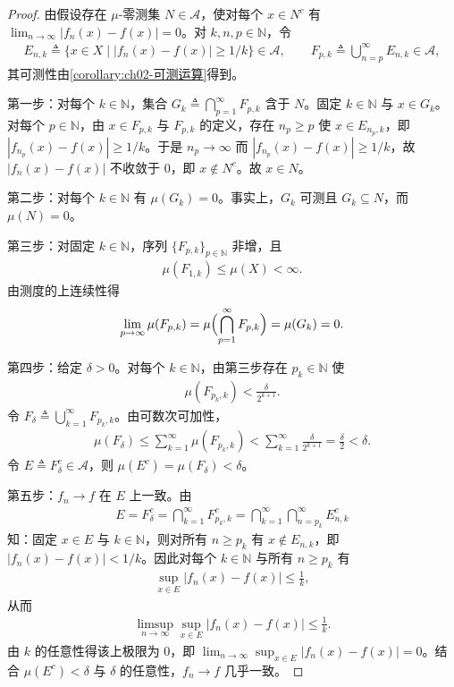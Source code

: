 \documentclass[../../main.tex]{subfiles}%
\begin{document}
\begin{proof}
由假设存在 $\mu$-零测集 $N\in\mathscr A$，使对每个 $x\in N^c$ 有 $\lim_{n\to\infty}|f_n(x)-f(x)|=0$。对 $k,n,p\in\mathbb{N}$，令
\begin{align*}
E_{n,k}\triangleq \{x\in X\mid|f_n(x)-f(x)|\geqslant 1/k\}\in\mathscr A,\qquad
F_{p,k}\triangleq \bigcup_{n=p}^\infty E_{n,k}\in\mathscr A,
\end{align*}
其可测性由\cref{corollary:ch02-可测运算}得到。

第一步：对每个 $k\in\mathbb{N}$，集合 $G_k\triangleq\bigcap_{p=1}^\infty F_{p,k}$ 含于 $N$。固定 $k\in\mathbb{N}$ 与 $x\in G_k$。对每个 $p\in\mathbb{N}$，由 $x\in F_{p,k}$ 与 $F_{p,k}$ 的定义，存在 $n_p\geqslant p$ 使 $x\in E_{n_p,k}$，即 $|f_{n_p}(x)-f(x)|\geqslant1/k$。于是 $n_p\to\infty$ 而 $|f_{n_p}(x)-f(x)|\geqslant1/k$，故 $|f_n(x)-f(x)|$ 不收敛于 $0$，即 $x\notin N^c$。故 $x\in N$。

第二步：对每个 $k\in\mathbb{N}$ 有 $\mu(G_k)=0$。事实上，$G_k$ 可测且 $G_k\subseteq N$，而 $\mu(N)=0$。

第三步：对固定 $k\in\mathbb{N}$，序列 $\{F_{p,k}\}_{p\in\mathbb{N}}$ 非增，且
\begin{align*}
\mu(F_{1,k})\leqslant\mu(X)<\infty.
\end{align*}
由测度的上连续性得
\begin{align*}
\lim_{p\to\infty}\mu(F_{p,k})=\mu\Bigl(\bigcap_{p=1}^\infty F_{p,k}\Bigr)=\mu(G_k)=0.
\end{align*}

第四步：给定 $\delta>0$。对每个 $k\in\mathbb{N}$，由第三步存在 $p_k\in\mathbb{N}$ 使
\begin{align*}
\mu(F_{p_k,k})<\frac{\delta}{2^{k+1}}.
\end{align*}
令 $F_\delta\triangleq\bigcup_{k=1}^\infty F_{p_k,k}$。由可数次可加性，
\begin{align*}
\mu(F_\delta)\leqslant\sum_{k=1}^\infty\mu(F_{p_k,k})<\sum_{k=1}^\infty\frac{\delta}{2^{k+1}}=\frac{\delta}{2}<\delta.
\end{align*}
令 $E\triangleq F_\delta^c\in\mathscr A$，则 $\mu(E^c)=\mu(F_\delta)<\delta$。

第五步：$f_n\to f$ 在 $E$ 上一致。由
\begin{align*}
E=F_\delta^c=\bigcap_{k=1}^\infty F_{p_k,k}^c=\bigcap_{k=1}^\infty\bigcap_{n=p_k}^\infty E_{n,k}^c
\end{align*}
知：固定 $x\in E$ 与 $k\in\mathbb{N}$，则对所有 $n\geqslant p_k$ 有 $x\notin E_{n,k}$，即 $|f_n(x)-f(x)|<1/k$。因此对每个 $k\in\mathbb{N}$ 与所有 $n\geqslant p_k$ 有
\begin{align*}
\sup_{x\in E}|f_n(x)-f(x)|\leqslant\frac1k,
\end{align*}
从而
\begin{align*}
\limsup_{n\to\infty}\sup_{x\in E}|f_n(x)-f(x)|\leqslant\frac1k.
\end{align*}
由 $k$ 的任意性得该上极限为 $0$，即 $\lim_{n\to\infty}\sup_{x\in E}|f_n(x)-f(x)|=0$。结合 $\mu(E^c)<\delta$ 与 $\delta$ 的任意性，$f_n\to f$ 几乎一致。
\end{proof}
\end{document}
